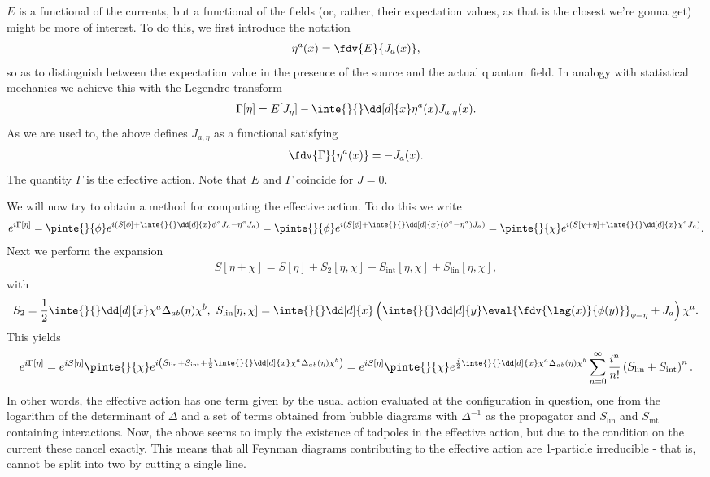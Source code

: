 $E$ is a functional of the currents, but a functional of the fields (or, rather, their expectation values, as that is the closest we're gonna get) might be more of interest. To do this, we first introduce the notation
\begin{align*}
	\eta^{a}(x) = \fdv{E}{J_{a}(x)},
\end{align*}
so as to distinguish between the expectation value in the presence of the source and the actual quantum field. In analogy with statistical mechanics we achieve this with the Legendre transform
\begin{align*}
	\Gamma[\eta] = E[J_{\eta}] - \inte{}{}\dd[d]{x}\eta^{a}(x)J_{a, \eta}(x).
\end{align*}
As we are used to, the above defines $J_{a, \eta}$ as a functional satisfying
\begin{align*}
	\fdv{\Gamma}{\eta^{a}(x)} = -J_{a}(x).
\end{align*}
The quantity $\Gamma$ is the effective action. Note that $E$ and $\Gamma$ coincide for $J = 0$.

We will now try to obtain a method for computing the effective action. To do this we write
\begin{align*}
	e^{i\Gamma[\eta]} = \pinte{}{\phi}e^{i\left(S[\phi] + \inte{}{}\dd[d]{x}\phi^{a}J_{a} - \eta^{a}J_{a}\right)} = \pinte{}{\phi}e^{i\left(S[\phi] + \inte{}{}\dd[d]{x}(\phi^{a} - \eta^{a})J_{a}\right)} = \pinte{}{\chi}e^{i\left(S[\chi + \eta] + \inte{}{}\dd[d]{x}\chi^{a}J_{a}\right)}.
\end{align*}
Next we perform the expansion
\begin{align*}
	S[\eta + \chi] = S[\eta] + S_{2}[\eta, \chi] + S_{\text{int}}[\eta, \chi] + S_{\text{lin}}[\eta, \chi],
\end{align*}
with
\begin{align*}
	S_{2} = \frac{1}{2}\inte{}{}\dd[d]{x}\chi^{a}\Delta_{ab}(\eta)\chi^{b},\ S_{\text{lin}}[\eta, \chi] = \inte{}{}\dd[d]{x}\left(\inte{}{}\dd[d]{y}\eval{\fdv{\lag(x)}{\phi(y)}}_{\phi = \eta} + J_{a}\right)\chi^{a}.
\end{align*}
This yields
\begin{align*}
	e^{i\Gamma[\eta]} = e^{iS[\eta]}\pinte{}{\chi}e^{i\left(S_{\text{lin}} + S_{\text{int}} + \frac{1}{2}\inte{}{}\dd[d]{x}\chi^{a}\Delta_{ab}(\eta)\chi^{b}\right)} = e^{iS[\eta]}\pinte{}{\chi}e^{\frac{i}{2}\inte{}{}\dd[d]{x}\chi^{a}\Delta_{ab}(\eta)\chi^{b}}\sum\limits_{n = 0}^{\infty}\frac{i^{n}}{n!}\left(S_{\text{lin}} + S_{\text{int}}\right)^{n}.
\end{align*}
In other words, the effective action has one term given by the usual action evaluated at the configuration in question, one from the logarithm of the determinant of $\Delta$ and a set of terms obtained from bubble diagrams with $\Delta^{-1}$ as the propagator and $S_{\text{lin}}$ and $S_{\text{int}}$ containing interactions. Now, the above seems to imply the existence of tadpoles in the effective action, but due to the condition on the current these cancel exactly. This means that all Feynman diagrams contributing to the effective action are 1-particle irreducible - that is, cannot be split into two by cutting a single line.

